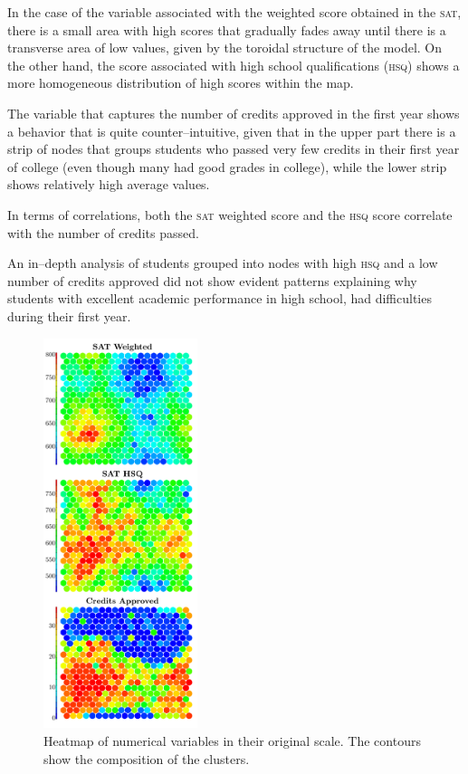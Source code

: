 \documentclass[5p,authoryear,preprint,12pt]{elsarticle}
\begin{document}
In the case of the variable associated with the weighted score obtained in the \textsc{sat}, there is a small area with high scores that gradually fades away until there is a transverse area of low values, given by the toroidal structure of the model. On the other hand, the score associated with high school qualifications (\textsc{hsq}) shows a more homogeneous distribution of high scores within the map. 

The variable that captures the number of credits approved in the first year shows a behavior that is quite counter--intuitive, given that in the upper part there is a strip of nodes that groups students who passed very few credits in their first year of college (even though many had good grades in college), while the lower strip shows relatively high average values. 

In terms of correlations, both the \textsc{sat} weighted score and the \textsc{hsq} score correlate with the number of credits passed.

An in--depth analysis of students grouped into nodes with high \textsc{hsq} and a low number of credits approved did not show evident patterns explaining why students with excellent academic performance in high school, had difficulties during their first year.

\begin{figure}[htb!] 
	\centering
	\includegraphics[width=0.4\textwidth]{standAloneSOM_V2.pdf}
	\caption{Heatmap of numerical variables in their original scale. The contours show the composition of the clusters.}
	\label{heatmap}
\end{figure}
\end{document}
